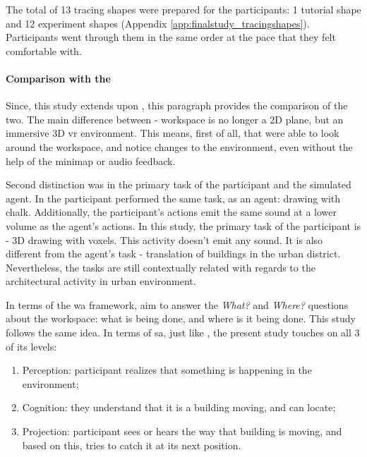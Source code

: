 The total of 13 tracing shapes were prepared for the participants: 1 tutorial shape and 12 experiment shapes (Appendix \ref{app:finalstudy_tracingshapes}).
Participants went through them in the same order at the pace that they felt comfortable with.

\paragraph{Comparison with the }
Since, this study extends upon \parencite{gutwin_chalk_2011}, this paragraph provides the comparison of the two.
The main difference between - workspace is no longer a 2D plane, but an immersive 3D \gls{vr} environment. This means, first of all, that were able to look around the workspace, and notice changes to the environment, even without the help of the minimap or audio feedback. 

Second distinction was in the primary task of the participant and the simulated agent. In \parencite{gutwin_chalk_2011} the participant performed the same task, as an agent: drawing with chalk. Additionally, the participant's actions emit the same sound at a lower volume as the agent's actions. In this study, the primary task of the participant is - 3D drawing with voxels. This activity doesn't emit any sound. It is also different from the agent's task - translation of buildings in the urban district. Nevertheless, the tasks are still contextually related with regards to the architectural activity in urban environment.

In terms of the \gls{wa} framework, \parencite{gutwin_chalk_2011} aim to answer the \textit{What?} and \textit{Where?} questions about the workspace: what is being done, and where is it being done. This study follows the same idea. In terms of \gls{sa}, just like \parencite{gutwin_chalk_2011}, the present study touches on all 3 of its levels: 
\begin{enumerate}
	\item Perception: participant realizes that something is happening in the environment;
	\item Cognition: they understand that it is a building moving, and can locate;
	\item Projection: participant sees or hears the way that building is moving, and based on this, tries to catch it at its next position.
\end{enumerate}

